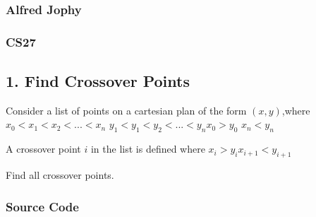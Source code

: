 \documentclass[
]{article}
\author{}
\date{}
\begin{document}
\hypertarget{alfred-jophy}{%
\subsubsection{Alfred Jophy}\label{alfred-jophy}}

\hypertarget{cs27}{%
\subsubsection{CS27}\label{cs27}}

\hypertarget{find-crossover-points}{%
\subsection{1. Find Crossover Points}\label{find-crossover-points}}

Consider a list of points on a cartesian plan of the form
\((x,y)\),where\newline \(x_0<x_1<x_2<...<x_n\)\newline
\(y_1<y_1<y_2<...<y_n\)\newline \(x_0 > y_0\)\newline
\(x_n < y_n\)\newline

A crossover point \(i\) in the list is defined where\newline
\(x_i > y_i\)\newline \(x_{i+1} < y_{i+1}\)\newline

Find all crossover points.

\hypertarget{source-code}{%
\subsubsection{Source Code}\label{source-code}}
\end{document}
